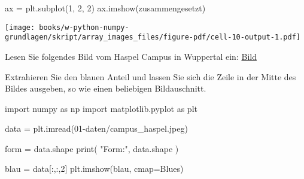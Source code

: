 \documentclass[
  letterpaper,
  DIV=11,
  numbers=noendperiod]{scrreprt}
\newenvironment{Shaded}{\begin{snugshade}}{\end{snugshade}}
\newcommand{\BuiltInTok}[1]{\textcolor[rgb]{0.00,0.23,0.31}{#1}}
\newcommand{\DecValTok}[1]{\textcolor[rgb]{0.68,0.00,0.00}{#1}}
\newcommand{\ImportTok}[1]{\textcolor[rgb]{0.00,0.46,0.62}{#1}}
\newcommand{\NormalTok}[1]{\textcolor[rgb]{0.00,0.23,0.31}{#1}}
\newcommand{\OperatorTok}[1]{\textcolor[rgb]{0.37,0.37,0.37}{#1}}
\newcommand{\StringTok}[1]{\textcolor[rgb]{0.13,0.47,0.30}{#1}}
\begin{document}
\begin{tcolorbox}
\begin{Shaded}
\begin{Highlighting}[]
\NormalTok{ax }\OperatorTok{=}\NormalTok{ plt.subplot(}\DecValTok{1}\NormalTok{, }\DecValTok{2}\NormalTok{, }\DecValTok{2}\NormalTok{)}
\NormalTok{ax.imshow(zusammengesetzt)}
\end{Highlighting}
\end{Shaded}

\texttt{[image: books/w-python-numpy-grundlagen/skript/array\_images\_files/figure-pdf/cell-10-output-1.pdf]}

\begin{tcolorbox}[enhanced jigsaw, breakable, opacityback=0, left=2mm, coltitle=black, leftrule=.75mm, colframe=quarto-callout-tip-color-frame, opacitybacktitle=0.6, toprule=.15mm, bottomtitle=1mm, titlerule=0mm, toptitle=1mm, title=\textcolor{quarto-callout-tip-color}{\faLightbulb}\hspace{0.5em}{Zwischenübung: Bilder bearbeiten}, colbacktitle=quarto-callout-tip-color!10!white, arc=.35mm, bottomrule=.15mm, rightrule=.15mm, colback=white]

Lesen Sie folgendes Bild vom Haspel Campus in Wuppertal ein:
\href{https://firedynamics.github.io/LectureComputerScience/_downloads/592f1fc843fc7c01bdcad17bf85ec15c/campus_haspel.jpeg}{Bild}

Extrahieren Sie den blauen Anteil und lassen Sie sich die Zeile in der
Mitte des Bildes ausgeben, so wie einen beliebigen Bildauschnitt.

\begin{tcolorbox}[enhanced jigsaw, breakable, opacityback=0, left=2mm, coltitle=black, leftrule=.75mm, colframe=quarto-callout-caution-color-frame, opacitybacktitle=0.6, toprule=.15mm, bottomtitle=1mm, titlerule=0mm, toptitle=1mm, title={Lösung}, colbacktitle=quarto-callout-caution-color!10!white, arc=.35mm, bottomrule=.15mm, rightrule=.15mm, colback=white]

\begin{Shaded}
\begin{Highlighting}[]
\ImportTok{import}\NormalTok{ numpy }\ImportTok{as}\NormalTok{ np}
\ImportTok{import}\NormalTok{ matplotlib.pyplot }\ImportTok{as}\NormalTok{ plt}

\NormalTok{data }\OperatorTok{=}\NormalTok{ plt.imread(}\StringTok{\textquotesingle{}01{-}daten/campus\_haspel.jpeg\textquotesingle{}}\NormalTok{)}

\NormalTok{form }\OperatorTok{=}\NormalTok{  data.shape}
\BuiltInTok{print}\NormalTok{( }\StringTok{"Form:"}\NormalTok{, data.shape )}

\NormalTok{blau }\OperatorTok{=}\NormalTok{  data[:,:,}\DecValTok{2}\NormalTok{]}
\NormalTok{plt.imshow(blau, cmap}\OperatorTok{=}\StringTok{\textquotesingle{}Blues\textquotesingle{}}\NormalTok{)}


\end{Highlighting}
\end{Shaded}
\end{tcolorbox}
\end{tcolorbox}
\end{tcolorbox}
\end{document}
